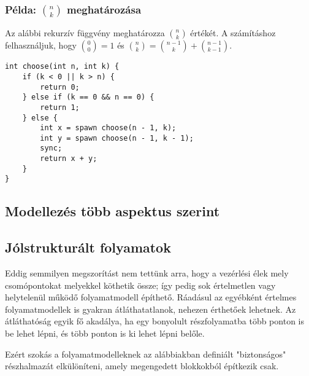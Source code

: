 \subsubsection{Példa: $n \choose k$ meghatározása}

Az alábbi rekurzív függvény meghatározza $n \choose k$ értékét. A számításhoz felhasználjuk, hogy ${0 \choose 0} = 1$ és ${n \choose k} = {n-1 \choose k} + {n-1 \choose k-1}$.


\begin{minipage}{\balhasab}
\begin{lstlisting}
int choose(int n, int k) {
	if (k < 0 || k > n) {
		return 0;
	} else if (k == 0 && n == 0) {
		return 1;
	} else {
		int x = spawn choose(n - 1, k);
		int y = spawn choose(n - 1, k - 1);
		sync;
		return x + y;
	}
}
\end{lstlisting}
\end{minipage}
\begin{minipage}{\jobbhasab}
\end{minipage}



\subsection{Modellezés több aspektus szerint}\label{sec:folyamatmodell-tobb-aspektusbol}

\subsection{Jólstrukturált folyamatok}\label{sec:jolstrukturalt-folyamatok}

Eddig semmilyen megszorítást nem tettünk arra, hogy a vezérlési élek mely csomópontokat melyekkel köthetik össze; így pedig sok értelmetlen vagy helytelenül működő folyamatmodell építhető. Ráadásul az egyébként értelmes folyamatmodellek is gyakran átláthatatlanok, nehezen érthetőek lehetnek. Az átláthatóság egyik fő akadálya, ha egy bonyolult részfolyamatba több ponton is be lehet lépni, és több ponton is ki lehet lépni belőle.

Ezért szokás a folyamatmodelleknek az alábbiakban definiált "biztonságos" részhalmazát elkülöníteni, amely megengedett blokkokból építkezik csak.


